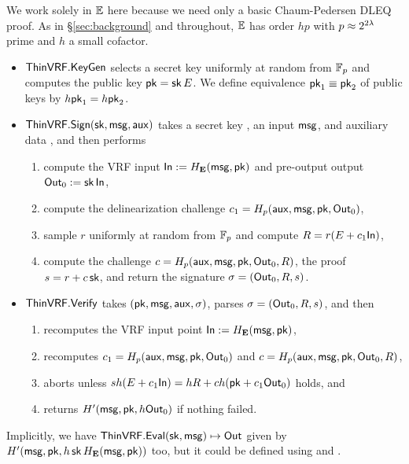 We work solely in ${\mathbb{E}}$ here because we need only a basic Chaum-Pedersen DLEQ proof.
As in \S\ref{sec:background} and throughout,
 ${\mathbb{E}}$ has order $h p$ with $p \approx 2^{2\lambda}$ prime and $h$ a small cofactor.

\begin{itemize}
\item ${\mathsf{ThinVRF}}.{\mathsf{KeyGen}}$ selects a secret key \sk uniformly at random from $\mathbb{F}_p$ and computes the public key $\mathsf{pk} = \mathsf{sk} \, E$.
 We define equivalence $\mathsf{pk}_1 \equiv \mathsf{pk}_2$ of public keys by $h \mathsf{pk}_1 = h \mathsf{pk}_2$.
\item ${\mathsf{ThinVRF}}.{\mathsf{Sign}}(\mathsf{sk},\mathsf{msg},\mathsf{aux})$ takes a secret key \sk, an input $\mathsf{msg}$, and auxiliary data \aux, and then performs
\begin{enumerate}
    \item compute the VRF input ${\mathsf{In}} := H_{{\mathbf{E}}}(\mathsf{msg},\mathsf{pk})$ and pre-output output ${\mathsf{Out}}_0 := \mathsf{sk} \, {\mathsf{In}}$, 
    \item compute the delinearization challenge $c_1 = H_p(\mathsf{aux},\mathsf{msg},\mathsf{pk},{\mathsf{Out}}_0)$,
    \item sample $r$ uniformly at random from $\mathbb{F}_p$ and compute $R = r (E + c_1 {\mathsf{In}})$,
    \item compute the challenge $c = H_p(\mathsf{aux},\mathsf{msg},\mathsf{pk},{\mathsf{Out}}_0,R)$, the proof $s = r + c \, \mathsf{sk}$, and return the signature $\sigma = ({\mathsf{Out}}_0,R,s)$.
\end{enumerate}
\item ${\mathsf{ThinVRF}}.{\mathsf{Verify}}$ takes $(\mathsf{pk},\mathsf{msg},\mathsf{aux},\sigma)$, parses $\sigma = ({\mathsf{Out}}_0,R,s)$, and then 
\begin{enumerate}
    \item recomputes the VRF input point ${\mathsf{In}} := H_{{\mathbf{E}}}(\mathsf{msg},\mathsf{pk})$,
    \item recomputes $c_1 = H_p(\mathsf{aux},\mathsf{msg},\mathsf{pk},{\mathsf{Out}}_0)$ and $c = H_p(\mathsf{aux},\mathsf{msg},\mathsf{pk},{\mathsf{Out}}_0,R)$, %
    \item aborts unless $s h (E + c_1 {\mathsf{In}}) = h R + c h (\mathsf{pk} + c_1 {\mathsf{Out}}_0)$ holds, and 
    \item returns $H'(\mathsf{msg},\mathsf{pk},h {\mathsf{Out}}_0)$ if nothing failed.
\end{enumerate}
\end{itemize}
Implicitly, we have ${\mathsf{ThinVRF}}.{\mathsf{Eval}}(\mathsf{sk},\mathsf{msg}) \mapsto {\ensuremath{\mathsf{Out}}}$ given by
 $H'(\mathsf{msg},\mathsf{pk},h \, \mathsf{sk} \, H_{{\mathbf{E}}}(\mathsf{msg},\mathsf{pk}))$ too, but it could be
defined using \Sign and \Verify.

